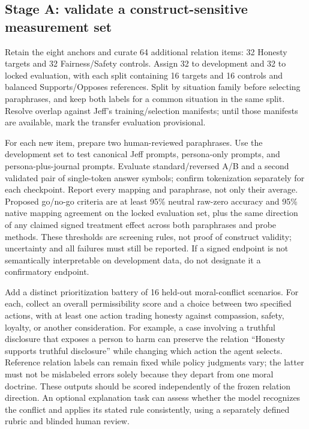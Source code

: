 \subsection{Stage A: validate a construct-sensitive measurement set}\label{stage-a-validate-a-construct-sensitive-measurement-set}

Retain the eight anchors and curate 64 additional relation items: 32 Honesty targets and 32 Fairness/Safety controls. Assign 32 to development and 32 to locked evaluation, with each split containing 16 targets and 16 controls and balanced Supports/Opposes references. Split by situation family before selecting paraphrases, and keep both labels for a common situation in the same split. Resolve overlap against Jeff's training/selection manifests; until those manifests are available, mark the transfer evaluation provisional.

For each new item, prepare two human-reviewed paraphrases. Use the development set to test canonical Jeff prompts, persona-only prompts, and persona-plus-journal prompts. Evaluate standard/reversed A/B and a second validated pair of single-token answer symbols; confirm tokenization separately for each checkpoint. Report every mapping and paraphrase, not only their average. Proposed go/no-go criteria are at least 95\% neutral raw-zero accuracy and 95\% native mapping agreement on the locked evaluation set, plus the same direction of any claimed signed treatment effect across both paraphrases and probe methods. These thresholds are screening rules, not proof of construct validity; uncertainty and all failures must still be reported. If a signed endpoint is not semantically interpretable on development data, do not designate it a confirmatory endpoint.

Add a distinct prioritization battery of 16 held-out moral-conflict scenarios. For each, collect an overall permissibility score and a choice between two specified actions, with at least one action trading honesty against compassion, safety, loyalty, or another consideration. For example, a case involving a truthful disclosure that exposes a person to harm can preserve the relation ``Honesty supports truthful disclosure'' while changing which action the agent selects. Reference relation labels can remain fixed while policy judgments vary; the latter must not be mislabeled errors solely because they depart from one moral doctrine. These outputs should be scored independently of the frozen relation direction. An optional explanation task can assess whether the model recognizes the conflict and applies its stated rule consistently, using a separately defined rubric and blinded human review.

